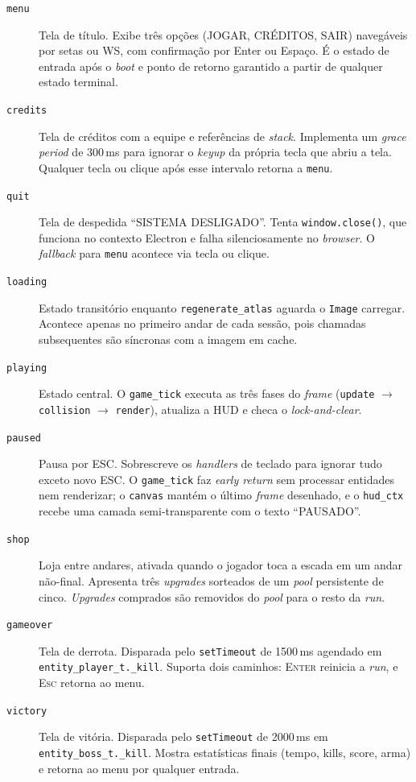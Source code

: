 \begin{description}

  \item[\texttt{menu}] Tela de título. Exibe três opções (\textsc{JOGAR},
    \textsc{CRÉDITOS}, \textsc{SAIR}) navegáveis por setas ou WS, com confirmação por
    Enter ou Espaço. É o estado de entrada após o \emph{boot} e ponto de retorno
    garantido a partir de qualquer estado terminal.

  \item[\texttt{credits}] Tela de créditos com a equipe e referências de \emph{stack}.
    Implementa um \emph{grace period} de 300\,ms para ignorar o \emph{keyup} da
    própria tecla que abriu a tela. Qualquer tecla ou clique após esse intervalo
    retorna a \texttt{menu}.

  \item[\texttt{quit}] Tela de despedida ``SISTEMA DESLIGADO''. Tenta
    \texttt{window.close()}, que funciona no contexto Electron e falha silenciosamente
    no \emph{browser}. O \emph{fallback} para \texttt{menu} acontece via tecla ou
    clique.

  \item[\texttt{loading}] Estado transitório enquanto \texttt{regenerate\_atlas}
    aguarda o \texttt{Image} carregar. Acontece apenas no primeiro andar de cada
    sessão, pois chamadas subsequentes são síncronas com a imagem em cache.

  \item[\texttt{playing}] Estado central. O \texttt{game\_tick} executa as três fases
    do \emph{frame} (\texttt{update} $\rightarrow$ \texttt{collision} $\rightarrow$
    \texttt{render}), atualiza a HUD e checa o \emph{lock-and-clear}.

  \item[\texttt{paused}] Pausa por \textsc{ESC}. Sobrescreve os \emph{handlers} de
    teclado para ignorar tudo exceto novo \textsc{ESC}. O \texttt{game\_tick} faz
    \emph{early return} sem processar entidades nem renderizar; o \texttt{canvas}
    mantém o último \emph{frame} desenhado, e o \texttt{hud\_ctx} recebe uma camada
    semi-transparente com o texto ``PAUSADO''.

  \item[\texttt{shop}] Loja entre andares, ativada quando o jogador toca a escada em
    um andar não-final. Apresenta três \emph{upgrades} sorteados de um \emph{pool}
    persistente de cinco. \emph{Upgrades} comprados são removidos do \emph{pool} para
    o resto da \emph{run}.

  \item[\texttt{gameover}] Tela de derrota. Disparada pelo \texttt{setTimeout} de
    1500\,ms agendado em \texttt{entity\_player\_t.\_kill}. Suporta dois caminhos:
    \textsc{Enter} reinicia a \emph{run}, e \textsc{Esc} retorna ao menu.

  \item[\texttt{victory}] Tela de vitória. Disparada pelo \texttt{setTimeout} de
    2000\,ms em \texttt{entity\_boss\_t.\_kill}. Mostra estatísticas finais (tempo,
    kills, score, arma) e retorna ao menu por qualquer entrada.

\end{description}

